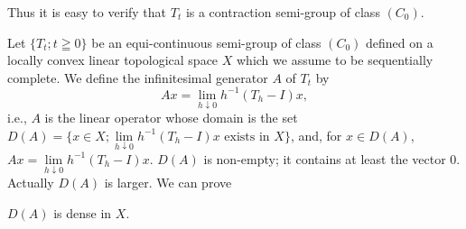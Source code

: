 Thus it is easy to verify that $T_{t}$ is a contraction semi-group of class $(C_0)$. 


\label{sec:IX.3}

Let $\{T_t; t \geqq 0\}$ be an equi-continuous semi-group of class $(C_0)$ defined on a locally convex linear topological space $X$ which we assume to be sequentially complete. We define the infinitesimal generator $A$ of $T_t$ by 
\begin{equation}\label{eq:IX.3.1}
A x = \lim\limits _{h \downarrow 0} h ^{-1} (T _{h} - I) x,
\end{equation}
i.e., $A$ is the linear operator whose domain is the set $D(A) = \{x \in X; \lim\limits_{h \downarrow 0} h^{-1}(T_h - I) x \text{ exists in } X\}$, and, for $x \in D(A)$, $Ax = \lim\limits_{h \downarrow 0} h^{-1}(T_h - I) x$. $D(A)$ is non-empty; it contains at least the vector $0$. Actually $D(A)$ is larger. We can prove 

\begin{theorem}\label{thm:IX.3.Theorem.1} $D(A)$ is dense in $X$. 
\end{theorem}


